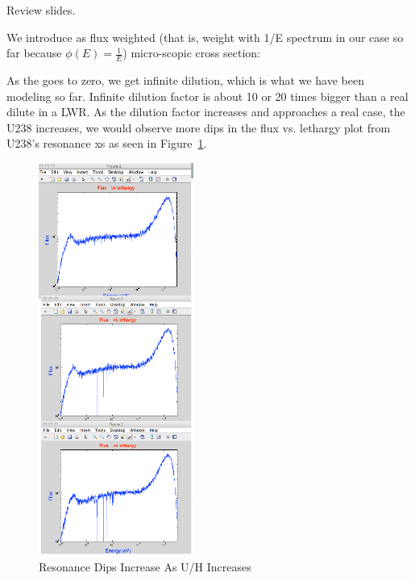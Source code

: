 \documentclass{school-22.211-notes}
\date{February 22, 2012}
\begin{document}
\maketitle

Review slides. 

We introduce  as flux weighted (that is, weight with 1/E spectrum in our case so far because $\phi(E) = \frac{1}{E}$) micro-scopic cross section:

As the  goes to zero, we get infinite dilution, which is what we have been modeling so far. Infinite dilution factor is about 10 or 20 times bigger than a real dilute in a LWR. As the dilution factor increases and approaches a real case, the U238 increases, we would observe more dips in the flux vs. lethargy plot from U238's resonance xs as seen in Figure~\ref{dilution-factor-increase}. 
\begin{figure}
  \centering
  \includegraphics[width=2in]{images/dilution-factor-increase.png}
  \caption{Resonance Dips Increase As U/H Increases} \label{dilution-factor-increase}
\end{figure}
\end{document}
